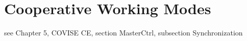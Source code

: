  

\section{Cooperative Working Modes}

see Chapter 5, COVISE CE, section MasterCtrl, subsection Synchronization







